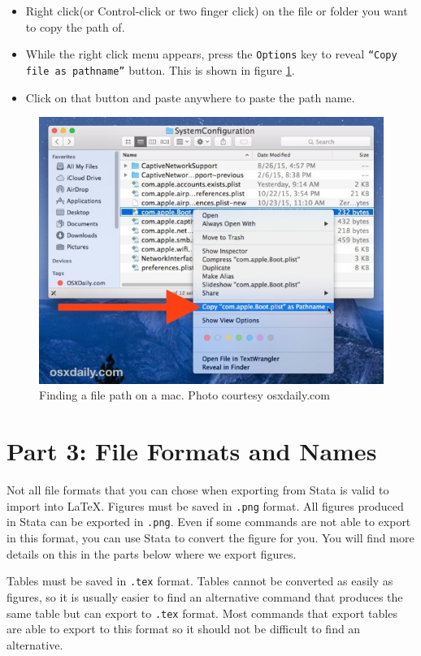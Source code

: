 \documentclass[]{article}
\begin{document}
\begin{itemize}
	\item Right click(or Control-click or two finger click) on the file or folder you want to copy the path of.
	\item While the right click menu appears, press the \texttt{Options} key to reveal \texttt{``Copy file as pathname''} button. This is shown in figure \ref{fig:filepathmac}.
	\item Click on that button and paste anywhere to paste the path name.
\end{itemize}
\begin{figure}
	\centering
	\includegraphics[width=0.7\linewidth]{../img/filepathmac}
	\caption{Finding a file path on a mac. Photo courtesy osxdaily.com}
	\label{fig:filepathmac}
\end{figure}

\section*{Part 3: File Formats and Names}
Not all file formats that you can chose when exporting from Stata is valid to import into {\LaTeX}. Figures must be saved in \texttt{.png} format. All figures produced in Stata can be exported in \texttt{.png}. Even if some commands are not able to export in this format, you can use Stata to convert the figure for you. You will find more details on this in the parts below where we export figures. 

Tables must be saved in \texttt{.tex} format. Tables cannot be converted as easily as figures, so it is usually easier to find an alternative command that produces the same table but can export to \texttt{.tex} format. Most commands that export tables are able to export to this format so it should not be difficult to find an alternative.
\end{document}
